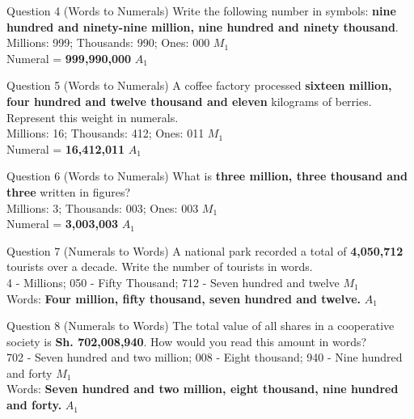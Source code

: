 \documentclass[12pt, a4paper, oneside]{article}
\begin{document}
\begin{solvingbox}{Question 4 (Words to Numerals)}
Write the following number in symbols: \textbf{nine hundred and ninety-nine million, nine hundred and ninety thousand}. \\
Millions: 999; Thousands: 990; Ones: 000 \hfill $M_1$ \\
Numeral = \textbf{999,990,000} \hfill $A_1$
\end{solvingbox}

\begin{solvingbox}{Question 5 (Words to Numerals)}
A coffee factory processed \textbf{sixteen million, four hundred and twelve thousand and eleven} kilograms of berries. Represent this weight in numerals. \\
Millions: 16; Thousands: 412; Ones: 011 \hfill $M_1$ \\
Numeral = \textbf{16,412,011} \hfill $A_1$
\end{solvingbox}

\begin{solvingbox}{Question 6 (Words to Numerals)}
What is \textbf{three million, three thousand and three} written in figures? \\
Millions: 3; Thousands: 003; Ones: 003 \hfill $M_1$ \\
Numeral = \textbf{3,003,003} \hfill $A_1$
\end{solvingbox}


\begin{solvingbox}{Question 7 (Numerals to Words)}
A national park recorded a total of \textbf{4,050,712} tourists over a decade. Write the number of tourists in words. \\
4 - Millions; 050 - Fifty Thousand; 712 - Seven hundred and twelve \hfill $M_1$ \\
Words: \textbf{Four million, fifty thousand, seven hundred and twelve.} \hfill $A_1$
\end{solvingbox}

\begin{solvingbox}{Question 8 (Numerals to Words)}
The total value of all shares in a cooperative society is \textbf{Sh. 702,008,940}. How would you read this amount in words? \\
702 - Seven hundred and two million; 008 - Eight thousand; 940 - Nine hundred and forty \hfill $M_1$ \\
Words: \textbf{Seven hundred and two million, eight thousand, nine hundred and forty.} \hfill $A_1$
\end{solvingbox}
\end{document}
